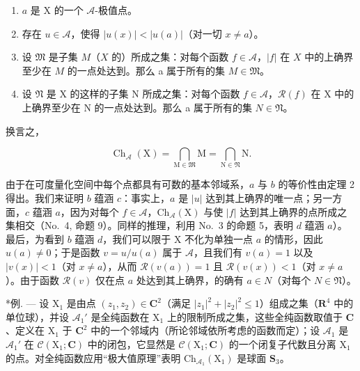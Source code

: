 \begin{enumerate}
\def\labelenumi{\alph{enumi})}
\item
  \(a\) 是 X 的一个 \(\mathcal{A}\)-极值点。
\item
  存在 \(u \in \mathcal{A}\)，使得 \(|u(x)| < |u(a)|\)（对一切 \(x \neq a\)）。
\item
  设 \(\mathfrak{M}\) 是子集 \(M\)（\(X\) 的）所成之集：对每个函数 \(f \in \mathcal{A}\)，\(|f|\) 在 \(X\) 中的上确界至少在 \(M\) 的一点处达到。那么 a 属于所有的集 \(M \in \mathfrak{M}\)。
\item
  设 \(\mathfrak{N}\) 是 X 的这样的子集 N 所成之集：对每个函数 \(f \in \mathcal{A}\)，\(\mathcal{R}(f)\) 在 X 中的上确界至少在 N 的一点处达到。那么 a 属于所有的集 \(N \in \mathfrak{N}\)。
\end{enumerate}

换言之，

\[
\operatorname{Ch} _ {\mathcal {A}} (\mathrm{X}) = \bigcap_ {\mathrm{M} \in \mathfrak {M}} \mathrm{M} = \bigcap_ {\mathrm{N} \in \mathfrak {N}} \mathrm{N}.\tag{18}
\]

由于在可度量化空间中每个点都具有可数的基本邻域系，\(a\) 与 \(b\) 的等价性由定理 2 得出。我们来证明 \(b\) 蕴涵 \(c\)：事实上，\(a\) 是 \(|u|\) 达到其上确界的唯一点；另一方面，\(c\) 蕴涵 \(a\)，因为对每个 \(f \in \mathcal{A}\)，\(\mathrm{Ch}_{\mathcal{A}}(\mathrm{X})\) 与使 \(|f|\) 达到其上确界的点所成之集相交（No.~4, 命题 9）。同样的推理，利用 No.~3 的命题 5，表明 \(d\) 蕴涵 \(a\)）。最后，为看到 \(b\) 蕴涵 \(d\)，我们可以限于 X 不化为单独一点 \(a\) 的情形，因此 \(u(a) \neq 0\)；于是函数 \(v = u / u(a)\) 属于 \(\mathcal{A}\)，且我们有 \(v(a) = 1\) 以及 \(|v(x)| < 1\)（对 \(x \neq a\)），从而 \(\mathcal{R}(v(a)) = 1\) 且 \(\mathcal{R}(v(x)) < 1\)（对 \(x \neq a\)）。由于函数 \(\mathcal{R}(v)\) 仅在点 \(a\) 处达到其上确界，的确有 \(a \in N\)（对每个 \(N \in \mathfrak{N}\)）。

*例. --- 设 \(\mathrm{X}_1\) 是由点 \((z_1, z_2) \in \mathbf{C}^2\)（满足 \(|z_1|^2 + |z_2|^2 \leqslant 1\)）组成之集（\(\mathbf{R}^4\) 中的单位球），并设 \(\mathcal{A}_1'\) 是全纯函数在 \(\mathrm{X}_1\) 上的限制所成之集，这些全纯函数取值于 \(\mathbf{C}\)、定义在 \(\mathrm{X}_1\) 于 \(\mathbf{C}^2\) 中的一个邻域内（所论邻域依所考虑的函数而定）；设 \(\mathcal{A}_1\) 是 \(\mathcal{A}_1'\) 在 \(\mathcal{C}(\mathrm{X}_1; \mathbf{C})\) 中的闭包，它显然是 \(\mathcal{C}(\mathrm{X}_1; \mathbf{C})\) 的一个闭复子代数且分离 \(\mathrm{X}_1\) 的点。对全纯函数应用“极大值原理”表明 \(\mathrm{Ch}_{\mathcal{A}_1}(\mathrm{X}_1)\) 是球面 \(\mathbf{S}_3\)。

